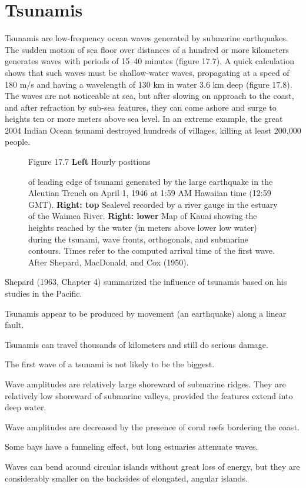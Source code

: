 \section{Tsunamis}
Tsunamis are low-frequency ocean waves
generated by submarine earthquakes. The sudden motion of sea floor
over distances of a hundred or more kilometers generates waves with
periods of 15--40 minutes (figure 17.7). A quick calculation shows
that such waves must be shallow-water waves, propagating at a speed of
180 m/s and having a wavelength of 130 km in water 3.6 km deep (figure
17.8). The waves are not noticeable at sea, but after slowing on
approach to the coast, and after refraction by sub-sea features, they
can come ashore and surge to heights ten or more meters above sea
level. In an extreme example, the great 2004 Indian Ocean
tsunami destroyed hundreds of villages,
killing at least 200,000 people.

\begin{figure}[t!]
\footnotesize
Figure 17.7 \textbf{Left} Hourly positions \rule{0mm}{3ex}of leading
edge of tsunami generated by the large
earthquake in the Aleutian Trench on April 1, 1946 at 1:59 AM Hawaiian
time (12:59 GMT).  \textbf{Right: top} Sealevel recorded by a river
gauge in the estuary of the Waimea River.  \textbf{Right: lower} Map
of Kauai showing the heights reached by the water (in meters above
lower low water) during the tsunami, wave fronts, orthogonals, and
submarine contours. Times refer to the computed arrival time of the
first wave. After Shepard, MacDonald, and Cox (1950).
\label{fig:tsunami}
\vspace{-2ex}
\end{figure}

Shepard (1963, Chapter 4) summarized the influence of
tsunamis based on his studies in the
Pacific.
\begin{enumerate}
\vitem Tsunamis appear to be produced by movement (an earthquake)
along a linear fault.

\vitem Tsunamis can travel thousands of kilometers and still do
serious damage.

\vitem The first wave of a tsunami is not likely to be the biggest.

\vitem Wave amplitudes are relatively large shoreward of submarine
ridges. They are relatively low shoreward of submarine valleys,
provided the features extend into deep water.

\vitem Wave amplitudes are decreased by the presence of coral reefs
bordering the coast.

\vitem Some bays have a funneling effect, but long estuaries attenuate
waves.

\vitem Waves can bend around circular islands without great loss of
energy, but they are considerably smaller on the backsides of
elongated, angular islands.
\end{enumerate}


